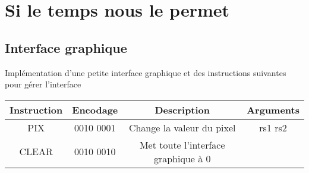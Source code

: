 \documentclass{article}
\begin{document}
\section*{Si le temps nous le permet}

\subsection*{Interface graphique}

Implémentation d'une petite interface graphique
et des instructions suivantes pour gérer l'interface

\begin{center}

\begin{tabular}{| c || c || c | c |}
    Instruction & Encodage & Description & Arguments\\ \hline
    PIX   & 0010 0001 & Change la valeur du pixel & rs1 rs2\\ \hline
    CLEAR & 0010 0010 & Met toute l'interface graphique à 0 & \\ \hline
    
\end{tabular}

\end{center}
\end{document}
